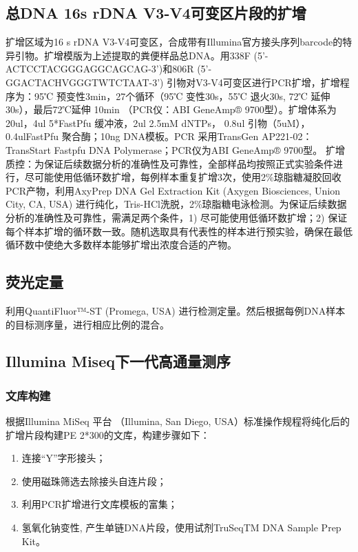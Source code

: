   \subsection{总DNA 16s rDNA V3-V4可变区片段的扩增}
  \label{总DNA 16s rDNA V3-V4可变区片段的扩增}
  扩增区域为16 s rDNA V3-V4可变区，合成带有Illumina官方接头序列barcode的特异引物。扩增模版为上述提取的粪便样品总DNA。用338F (5’-ACTCCTACGGGAGGCAGCAG-3’)和806R (5’-GGACTACHVGGGTWTCTAAT-3’) 引物对V3-V4可变区进行PCR扩增，扩增程序为：95℃ 预变性3min，27个循环（95℃ 变性30s，55℃ 退火30s, 72℃ 延伸30s），最后72℃延伸 10min （PCR仪：ABI GeneAmp® 9700型）。扩增体系为20ul，4ul 5*FastPfu 缓冲液，2ul 2.5mM dNTPs， 0.8ul 引物（5uM）， 0.4ulFastPfu 聚合酶；10ng DNA模板。PCR 采用TransGen AP221-02：TransStart Fastpfu DNA Polymerase；PCR仪为ABI GeneAmp® 9700型。
  扩增质控：为保证后续数据分析的准确性及可靠性，全部样品均按照正式实验条件进行，尽可能使用低循环数扩增，每例样本重复扩增3次，使用2\%琼脂糖凝胶回收PCR产物，利用AxyPrep DNA Gel Extraction Kit (Axygen Biosciences, Union City, CA, USA) 进行纯化，Tris-HCl洗脱，2\%琼脂糖电泳检测。为保证后续数据分析的准确性及可靠性，需满足两个条件，1) 尽可能使用低循环数扩增；2) 保证每个样本扩增的循环数一致。随机选取具有代表性的样本进行预实验，确保在最低循环数中使绝大多数样本能够扩增出浓度合适的产物。
  \subsection{荧光定量}
  \label{荧光定量}
  利用QuantiFluor™-ST (Promega, USA) 进行检测定量。然后根据每例DNA样本的目标测序量，进行相应比例的混合。
  \subsection{Illumina Miseq下一代高通量测序}
  \label{Illumina Miseq下一代高通量测序}
      \subsubsection{文库构建}
      根据Illumina MiSeq 平台 （Illumina, San Diego, USA）标准操作规程将纯化后的扩增片段构建PE 2*300的文库，构建步骤如下：
        \begin{enumerate}
          \item 连接“Y”字形接头；
          \item 使用磁珠筛选去除接头自连片段；
          \item 利用PCR扩增进行文库模板的富集；
          \item 氢氧化钠变性, 产生单链DNA片段，使用试剂TruSeqTM DNA Sample Prep Kit。
        \end{enumerate}
